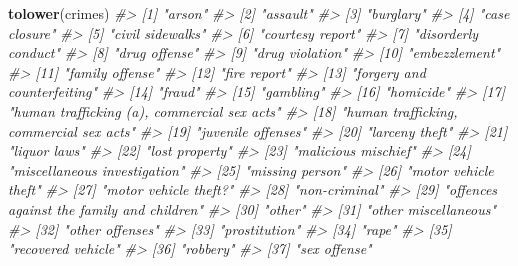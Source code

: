 \documentclass[
  12pt,
]{book}
\newenvironment{Shaded}{\begin{snugshade}}{\end{snugshade}}
\newcommand{\CommentTok}[1]{\textcolor[rgb]{0.56,0.35,0.01}{\textit{#1}}}
\newcommand{\KeywordTok}[1]{\textcolor[rgb]{0.13,0.29,0.53}{\textbf{#1}}}
\newcommand{\NormalTok}[1]{#1}
\begin{document}
\begin{Shaded}
\begin{Highlighting}[]
\KeywordTok{tolower}\NormalTok{(crimes)}
\CommentTok{\#>  [1] "arson"                                     }
\CommentTok{\#>  [2] "assault"                                   }
\CommentTok{\#>  [3] "burglary"                                  }
\CommentTok{\#>  [4] "case closure"                              }
\CommentTok{\#>  [5] "civil sidewalks"                           }
\CommentTok{\#>  [6] "courtesy report"                           }
\CommentTok{\#>  [7] "disorderly conduct"                        }
\CommentTok{\#>  [8] "drug offense"                              }
\CommentTok{\#>  [9] "drug violation"                            }
\CommentTok{\#> [10] "embezzlement"                              }
\CommentTok{\#> [11] "family offense"                            }
\CommentTok{\#> [12] "fire report"                               }
\CommentTok{\#> [13] "forgery and counterfeiting"                }
\CommentTok{\#> [14] "fraud"                                     }
\CommentTok{\#> [15] "gambling"                                  }
\CommentTok{\#> [16] "homicide"                                  }
\CommentTok{\#> [17] "human trafficking (a), commercial sex acts"}
\CommentTok{\#> [18] "human trafficking, commercial sex acts"    }
\CommentTok{\#> [19] "juvenile offenses"                         }
\CommentTok{\#> [20] "larceny theft"                             }
\CommentTok{\#> [21] "liquor laws"                               }
\CommentTok{\#> [22] "lost property"                             }
\CommentTok{\#> [23] "malicious mischief"                        }
\CommentTok{\#> [24] "miscellaneous investigation"               }
\CommentTok{\#> [25] "missing person"                            }
\CommentTok{\#> [26] "motor vehicle theft"                       }
\CommentTok{\#> [27] "motor vehicle theft?"                      }
\CommentTok{\#> [28] "non{-}criminal"                              }
\CommentTok{\#> [29] "offences against the family and children"  }
\CommentTok{\#> [30] "other"                                     }
\CommentTok{\#> [31] "other miscellaneous"                       }
\CommentTok{\#> [32] "other offenses"                            }
\CommentTok{\#> [33] "prostitution"                              }
\CommentTok{\#> [34] "rape"                                      }
\CommentTok{\#> [35] "recovered vehicle"                         }
\CommentTok{\#> [36] "robbery"                                   }
\CommentTok{\#> [37] "sex offense"                               }

\end{Highlighting}
\end{Shaded}
\end{document}
